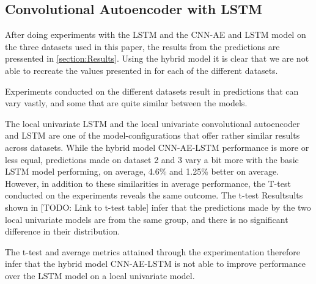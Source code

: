 
\subsection{Convolutional Autoencoder with LSTM}
\label{section:Discussion:Discussion:CNN-AE-LSTM}






After doing experiments with the LSTM and the CNN-AE and LSTM model on the three datasets used in this paper,
the results from the predictions are pressented in \cref{section:Results}.
Using the hybrid model it is clear that we are not able to recreate the values presented in \cite{Zhao2019}
for each of the different datasets.

Experiments conducted on the different datasets result in predictions that can vary vastly,
and some that are quite similar between the models.

The local univariate LSTM and the local univariate convolutional autoencoder and LSTM are one of the model-configurations
that offer rather similar results across datasets.
While the hybrid model CNN-AE-LSTM performance is more or less equal, predictions made on dataset 2 and 3 vary a bit more
with the basic LSTM model performing, on average, 4.6\% and 1.25\% better on average.
However, in addition to these similarities in average performance, the T-test conducted on the experiments reveals the same outcome.
The t-test Resultsults shown in [TODO: Link to t-test table] infer that the predictions made by the two local univariate models
are from the same group, and there is no significant difference in their distribution.

The t-test and average metrics attained through the experimentation therefore infer that the hybrid model CNN-AE-LSTM
is not able to improve performance over the LSTM model on a local univariate model.


